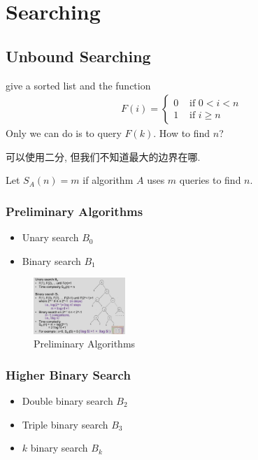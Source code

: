 \newpage
\section{Searching}
\subsection{Unbound Searching}
give a sorted list and the function
\begin{align*}
    F(i)=\left\{ \begin{array}{ll}
        0 & \text{ if }0<i<n\\
        1 & \text{ if }i\ge n
    \end{array} \right.
\end{align*}
Only we can do is to query $F(k)$. How to find $n$?

可以使用二分, 但我们不知道最大的边界在哪.

Let $S_A(n)=m$ if algorithm $A$ uses $m$ queries to find $n$. 

\subsubsection{Preliminary Algorithms}
\begin{itemize}
    \item Unary search $B_0$
    \item Binary search $B_1$
\end{itemize}

\begin{figure}[H]
    \centering
    \includegraphics[width=0.309\textwidth]{pic/DAA4/Preliminary Algorithms}
    \caption{Preliminary Algorithms}
\end{figure}


\subsubsection{Higher Binary Search}
\begin{itemize}
    \item Double binary search $B_2$
    \item Triple binary search $B_3$
    \item $k$ binary search $B_k$
\end{itemize}

